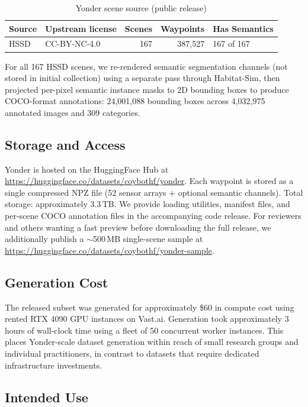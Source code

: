 \documentclass{article}
\begin{document}
\begin{table}[h]
\centering
\caption{Yonder scene source (public release)}
\label{tab:sources}
\begin{tabular}{llrrl}
\toprule
Source & Upstream license & Scenes & Waypoints & Has Semantics \\
\midrule
HSSD & CC-BY-NC-4.0 & 167 & 387,527 & 167 of 167 \\
\bottomrule
\end{tabular}
\end{table}

For all 167 HSSD scenes, we re-rendered semantic segmentation channels (not stored in initial collection) using a separate pass through Habitat-Sim, then projected per-pixel semantic instance masks to 2D bounding boxes to produce COCO-format annotations: 24,001,088 bounding boxes across 4,032,975 annotated images and 309 categories.

\subsection{Storage and Access}

Yonder is hosted on the HuggingFace Hub at \url{https://huggingface.co/datasets/coybothf/yonder}. Each waypoint is stored as a single compressed NPZ file (52 sensor arrays + optional semantic channels). Total storage: approximately 3.3\,TB. We provide loading utilities, manifest files, and per-scene COCO annotation files in the accompanying code release. For reviewers and others wanting a fast preview before downloading the full release, we additionally publish a $\sim$500\,MB single-scene sample at \url{https://huggingface.co/datasets/coybothf/yonder-sample}.

\subsection{Generation Cost}

The released subset was generated for approximately \$60 in compute cost using rented RTX 4090 GPU instances on Vast.ai. Generation took approximately 3 hours of wall-clock time using a fleet of 50 concurrent worker instances. This places Yonder-scale dataset generation within reach of small research groups and individual practitioners, in contrast to datasets that require dedicated infrastructure investments.

\subsection{Intended Use}
\end{document}
